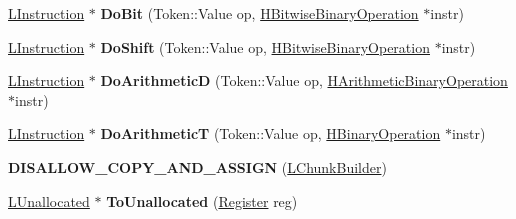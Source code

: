 \begin{DoxyCompactItemize}
\item 
\hyperlink{classv8_1_1internal_1_1_l_instruction}{L\+Instruction} $\ast$ {\bfseries Do\+Bit} (Token\+::\+Value op, \hyperlink{classv8_1_1internal_1_1_h_bitwise_binary_operation}{H\+Bitwise\+Binary\+Operation} $\ast$instr)\hypertarget{classv8_1_1internal_1_1_l_chunk_builder_a0ae930f423ac37b55e6a988742ddc907}{}\label{classv8_1_1internal_1_1_l_chunk_builder_a0ae930f423ac37b55e6a988742ddc907}

\item 
\hyperlink{classv8_1_1internal_1_1_l_instruction}{L\+Instruction} $\ast$ {\bfseries Do\+Shift} (Token\+::\+Value op, \hyperlink{classv8_1_1internal_1_1_h_bitwise_binary_operation}{H\+Bitwise\+Binary\+Operation} $\ast$instr)\hypertarget{classv8_1_1internal_1_1_l_chunk_builder_a7fb98733b4fc4b83c5f63039c8bc249f}{}\label{classv8_1_1internal_1_1_l_chunk_builder_a7fb98733b4fc4b83c5f63039c8bc249f}

\item 
\hyperlink{classv8_1_1internal_1_1_l_instruction}{L\+Instruction} $\ast$ {\bfseries Do\+ArithmeticD} (Token\+::\+Value op, \hyperlink{classv8_1_1internal_1_1_h_arithmetic_binary_operation}{H\+Arithmetic\+Binary\+Operation} $\ast$instr)\hypertarget{classv8_1_1internal_1_1_l_chunk_builder_a9b447e818699e4928b4f769ae6b7ecbd}{}\label{classv8_1_1internal_1_1_l_chunk_builder_a9b447e818699e4928b4f769ae6b7ecbd}

\item 
\hyperlink{classv8_1_1internal_1_1_l_instruction}{L\+Instruction} $\ast$ {\bfseries Do\+ArithmeticT} (Token\+::\+Value op, \hyperlink{classv8_1_1internal_1_1_h_binary_operation}{H\+Binary\+Operation} $\ast$instr)\hypertarget{classv8_1_1internal_1_1_l_chunk_builder_aba09d1f1c27b568c058b1d54bb250d12}{}\label{classv8_1_1internal_1_1_l_chunk_builder_aba09d1f1c27b568c058b1d54bb250d12}

\item 
{\bfseries D\+I\+S\+A\+L\+L\+O\+W\+\_\+\+C\+O\+P\+Y\+\_\+\+A\+N\+D\+\_\+\+A\+S\+S\+I\+GN} (\hyperlink{classv8_1_1internal_1_1_l_chunk_builder}{L\+Chunk\+Builder})\hypertarget{classv8_1_1internal_1_1_l_chunk_builder_a19b07322023329077a9f8c29451592b5}{}\label{classv8_1_1internal_1_1_l_chunk_builder_a19b07322023329077a9f8c29451592b5}

\item 
\hyperlink{classv8_1_1internal_1_1_l_unallocated}{L\+Unallocated} $\ast$ {\bfseries To\+Unallocated} (\hyperlink{structv8_1_1internal_1_1_register}{Register} reg)\hypertarget{classv8_1_1internal_1_1_l_chunk_builder_ae996944c8e59f0e19fe2743090135cb9}{}\label{classv8_1_1internal_1_1_l_chunk_builder_ae996944c8e59f0e19fe2743090135cb9}


\end{DoxyCompactItemize}
